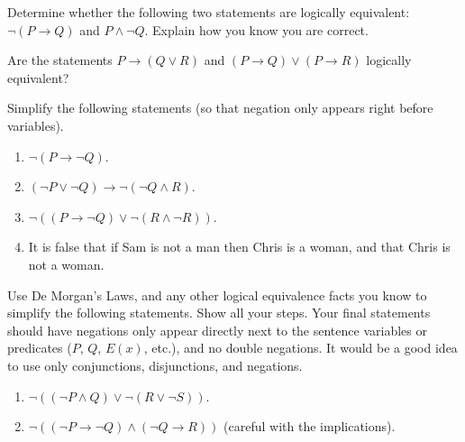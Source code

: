 \documentclass[10pt,]{book}
\theoremstyle{plain}
\theoremstyle{definition}
\theoremstyle{definition}
\theoremstyle{definition}
\theoremstyle{definition}
\numberwithin{equation}{chapter}
\def\imp{\rightarrow}
\begin{document}
\begin{divisionexercise}{5}\hypertarget{exercise-224}{}
\hypertarget{p-1872}{}%
Determine whether the following two statements are logically equivalent:  \(\neg(P \imp Q)\) and \(P \wedge \neg Q\). Explain how you know you are correct.%
\end{divisionexercise}%
\begin{divisionexercise}{6}\hypertarget{exercise-225}{}
\hypertarget{p-1874}{}%
Are the statements \(P \imp (Q\vee R)\) and \((P \imp Q) \vee (P \imp R)\) logically equivalent?%
\end{divisionexercise}%
\begin{divisionexercise}{7}\hypertarget{exercise-226}{}
\hypertarget{p-1875}{}%
Simplify the following statements (so that negation only appears right before variables).%
\par
\hypertarget{p-1876}{}%
\leavevmode%
\begin{enumerate}[label=(\alph*)]
\item\hypertarget{li-651}{}\(\neg(P \imp \neg Q)\).%
\item\hypertarget{li-652}{}\((\neg P \vee \neg Q) \imp \neg (\neg Q \wedge R)\).%
\item\hypertarget{li-653}{}\(\neg((P \imp \neg Q) \vee \neg (R \wedge \neg R))\).%
\item\hypertarget{li-654}{}\hypertarget{p-1877}{}%
It is false that if Sam is not a man then Chris is a woman, and that Chris is not a woman.%
\end{enumerate}
%
\end{divisionexercise}%
\begin{divisionexercise}{8}\hypertarget{exercise-227}{}
\hypertarget{p-1881}{}%
Use De Morgan's Laws, and any other logical equivalence facts you know to simplify the following statements. Show all your steps. Your final statements should have negations only appear directly next to the sentence variables or predicates (\(P\), \(Q\), \(E(x)\), etc.), and no double negations. It would be a good idea to use only conjunctions, disjunctions, and negations.%
\par
\hypertarget{p-1882}{}%
\leavevmode%
\begin{enumerate}[label=(\alph*)]
\item\hypertarget{li-659}{}\(\neg((\neg P \wedge Q) \vee \neg(R \vee \neg S))\). %
\item\hypertarget{li-660}{}\(\neg((\neg P \imp \neg Q) \wedge (\neg Q \imp R))\) (careful with the implications). %
\end{enumerate}
%
\end{divisionexercise}%
\end{document}
